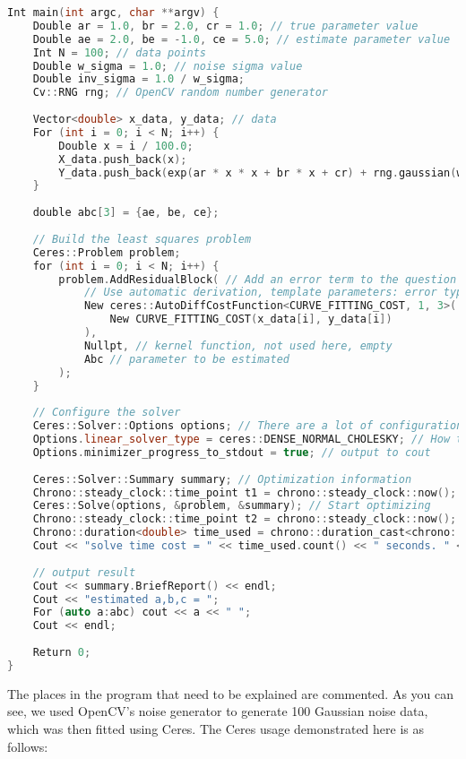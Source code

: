 \begin{lstlisting}[language=c++,caption=slambook/ch6/ceresCurveFitting.cpp]
Int main(int argc, char **argv) {
    Double ar = 1.0, br = 2.0, cr = 1.0; // true parameter value
    Double ae = 2.0, be = -1.0, ce = 5.0; // estimate parameter value
    Int N = 100; // data points
    Double w_sigma = 1.0; // noise sigma value
    Double inv_sigma = 1.0 / w_sigma;
    Cv::RNG rng; // OpenCV random number generator
    
    Vector<double> x_data, y_data; // data
    For (int i = 0; i < N; i++) {
        Double x = i / 100.0;
        X_data.push_back(x);
        Y_data.push_back(exp(ar * x * x + br * x + cr) + rng.gaussian(w_sigma * w_sigma));
    }
    
    double abc[3] = {ae, be, ce};
    
    // Build the least squares problem
    Ceres::Problem problem;
    for (int i = 0; i < N; i++) {
        problem.AddResidualBlock( // Add an error term to the question
            // Use automatic derivation, template parameters: error type, output dimension, input dimension, dimension must be consistent with the previous struct
            New ceres::AutoDiffCostFunction<CURVE_FITTING_COST, 1, 3>(
                New CURVE_FITTING_COST(x_data[i], y_data[i])
            ),
            Nullpt, // kernel function, not used here, empty
            Abc // parameter to be estimated
        );
    }
    
    // Configure the solver
    Ceres::Solver::Options options; // There are a lot of configuration items to fill in
    Options.linear_solver_type = ceres::DENSE_NORMAL_CHOLESKY; // How to solve the incremental equation
    Options.minimizer_progress_to_stdout = true; // output to cout
    
    Ceres::Solver::Summary summary; // Optimization information
    Chrono::steady_clock::time_point t1 = chrono::steady_clock::now();
    Ceres::Solve(options, &problem, &summary); // Start optimizing
    Chrono::steady_clock::time_point t2 = chrono::steady_clock::now();
    Chrono::duration<double> time_used = chrono::duration_cast<chrono::duration<double>>(t2 - t1);
    Cout << "solve time cost = " << time_used.count() << " seconds. " << endl;
    
    // output result
    Cout << summary.BriefReport() << endl;
    Cout << "estimated a,b,c = ";
    For (auto a:abc) cout << a << " ";
    Cout << endl;
    
    Return 0;
}
\end{lstlisting}

The places in the program that need to be explained are commented. As you can see, we used OpenCV's noise generator to generate 100 Gaussian noise data, which was then fitted using Ceres. The Ceres usage demonstrated here is as follows:

